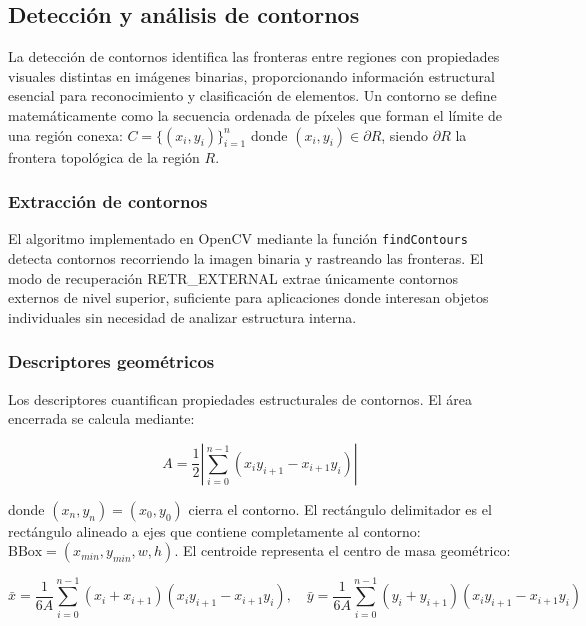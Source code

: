 \subsection{Detección y análisis de contornos}

La detección de contornos identifica las fronteras entre regiones con propiedades visuales distintas en imágenes binarias, proporcionando información estructural esencial para reconocimiento y clasificación de elementos. Un contorno se define matemáticamente como la secuencia ordenada de píxeles que forman el límite de una región conexa: $C = \{(x_i, y_i)\}_{i=1}^{n}$ donde $(x_i, y_i) \in \partial R$, siendo $\partial R$ la frontera topológica de la región $R$.

\subsubsection{Extracción de contornos}

El algoritmo implementado en OpenCV mediante la función \texttt{findContours} detecta contornos recorriendo la imagen binaria y rastreando las fronteras. El modo de recuperación RETR\_EXTERNAL extrae únicamente contornos externos de nivel superior, suficiente para aplicaciones donde interesan objetos individuales sin necesidad de analizar estructura interna.

\subsubsection{Descriptores geométricos}

Los descriptores cuantifican propiedades estructurales de contornos. El área encerrada se calcula mediante:

\begin{equation}
A = \frac{1}{2}\left|\sum_{i=0}^{n-1}(x_i y_{i+1} - x_{i+1}y_i)\right|
\end{equation}

donde $(x_n, y_n) = (x_0, y_0)$ cierra el contorno. El rectángulo delimitador es el rectángulo alineado a ejes que contiene completamente al contorno: $\text{BBox} = (x_{min}, y_{min}, w, h)$. El centroide representa el centro de masa geométrico:

\begin{equation}
\bar{x} = \frac{1}{6A}\sum_{i=0}^{n-1}(x_i + x_{i+1})(x_i y_{i+1} - x_{i+1}y_i), \quad \bar{y} = \frac{1}{6A}\sum_{i=0}^{n-1}(y_i + y_{i+1})(x_i y_{i+1} - x_{i+1}y_i)
\end{equation}

